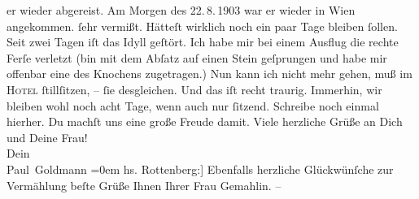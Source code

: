 \begin{ledgroupsized}[t]{13cm}
{{{                  er wieder abgereist. Am Morgen des 22. 8. 1903 war er wieder in Wien angekommen.}}}\label{K_L03385-4h} ſehr vermißt. Hätteſt wirklich noch
               ein paar Tage bleiben ſollen.\pend
           \pstart
           Seit zwei Tagen iſt das Idyll geſtört. Ich habe mir bei einem Ausflug die \introOben{}rechte\introOben{} Ferſe verletzt (bin mit dem Abſatz auf einen Stein
               geſprungen und habe mir offenbar eine \label{K_L03385-5v}\label{K_L03385-5h} des Knochens zugetragen.) Nun kann ich nicht mehr {\pb}gehen, muß im \textsc{Hotel}{ } ſtillſitzen, – ſie desgleichen. Und das iſt
               recht traurig.\pend
           \pstart
           Immerhin, wir bleiben wohl noch acht Tage, wenn auch nur ſitzend. Schreibe noch
               einmal hierher. Du machſt uns eine große Freude damit.\pend
           \pstart
           Viele herzliche Grüße an Dich und Deine Frau! {\\[\baselineskip]}Dein {\\[\baselineskip]}\spacefill\mbox{Paul Goldmann}\pend
           \leftskip=0em{}\pstart
           \noindent{}{[}hs. Rottenberg:{]} Ebenfalls herzliche Glückwünſche zur Vermählung {\kaufmannsund} beſte Grüße Ihnen {\kaufmannsund}
                  Ihrer Frau Gemahlin. –\pend
           
         
         \endnumbering{}\end{ledgroupsized}  \newcommand{\dateiname}{L03385}\newcommand{\titel}{Paul Goldmann und Theodore Rottenberg an Arthur Schnitzler, 29. 8. 1903}\newcommand{\editorInnen}{Martin Anton Müller und Laura Untner}
      